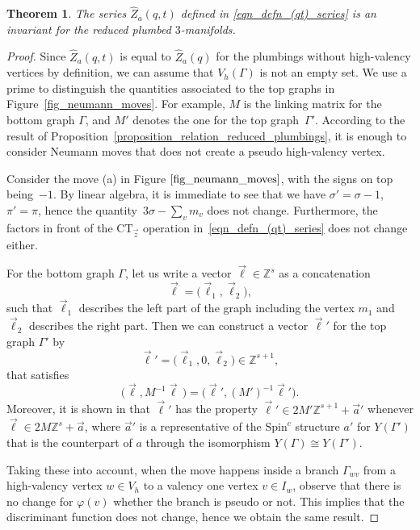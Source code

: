 \documentclass[pdftex]{sigma}
\numberwithin{equation}{section}
\newtheorem{Theorem}{Theorem}[section]
\begin{document}
\begin{Theorem}\label{theorem_invariance}
The series $ \hat{Z}_a(q,t) $ defined in \eqref{eqn_defn_(qt)_series} is an invariant for the reduced plumbed $3$-manifolds.
\end{Theorem}
\begin{proof}
Since $ \hat{Z}_a(q,t)$ is equal to $\hat{Z}_a(q) $ for the plumbings without high-valency vertices by definition, we can assume that $ V_h(\Gamma ) $ is not an empty set. We use a prime to distinguish the quantities associated to the top graphs in Figure~\ref{fig_neumann_moves}. For example, $ M $ is the linking matrix for the bottom graph $ \Gamma $, and $ M' $ denotes the one for the top graph~$ \Gamma' $. According to the result of Proposition~\ref{proposition_relation_reduced_plumbings}, it is enough to consider Neumann moves that does not create a pseudo high-valency vertex.
	
Consider the move (a) in Figure $ \ref{fig_neumann_moves} $, with the signs on top being~$ -1 $. By linear algebra, it is immediate to see that we have $ \sigma'=\sigma-1 $, $ \pi'=\pi $, hence the quantity~$ 3\sigma-\sum_v m_v $ does not change. Furthermore, the factors in front of the $ \text{CT}_{\vec{z}} $ operation in~\eqref{eqn_defn_(qt)_series} does not change either.
	
For the bottom graph $ \Gamma $, let us write a vector $ \vec{\ell}\in \mathbb{Z}^s $ as a concatenation
	\[
	\vec{\ell}=\big(\vec{\ell}_1,\vec{\ell}_2\big),
	\]
	such that $ \vec{\ell}_1 $ describes the left part of the graph including the vertex $ m_1 $ and $ \vec{\ell}_2 $ describes the right part. Then we can construct a vector $ \vec{\ell}' $ for the top graph $ \Gamma' $ by
	\[
	\vec{\ell}'=\big(\vec{\ell}_1,0,\vec{\ell}_2\big)\in \mathbb{Z}^{s+1},
	\]
	that satisfies
	\begin{equation}\label{eqn_ells_relation_move_A}
		\big(\vec{\ell},M^{-1}\vec{\ell}\,\big)=\big(\vec{\ell}',(M')^{-1}\vec{\ell}'\big).
	\end{equation}
	Moreover, it is shown in \cite{gukov} that $ \vec{\ell}' $ has the property $ \vec{\ell}'\in 2M'\mathbb{Z}^{s+1}+\vec{a}' $ whenever $ \vec{\ell}\in 2M\mathbb{Z}^s+\vec{a} $, where $ \vec{a}' $ is a representative of the $ \text{Spin}^c $ structure $ a' $ for $ Y(\Gamma') $ that is the counterpart of $ a $ through the isomorphism $ Y(\Gamma)\cong Y(\Gamma') $.
	
	Taking these into account, when the move happens inside a branch $ \Gamma_{wv} $ from a high-valency vertex $ w\in V_h $ to a valency one vertex $ v\in I_w $, observe that there is no change for $ \varphi(v) $ whether the branch is pseudo or not. This implies that the discriminant function does not change, hence we obtain the same result.
	

\end{proof}
\end{document}
